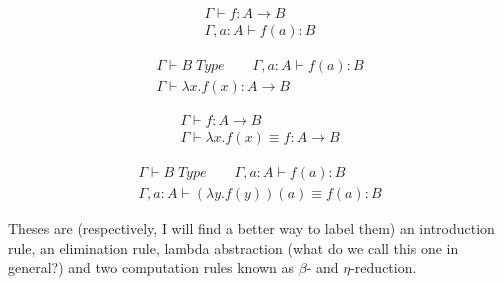 \begin{equation}
  \begin{array}{c}
    \Gamma \vdash f : A \rightarrow B\\
    \hline
    \Gamma, a : A \vdash f(a) : B
  \end{array}
  \label{rule:function-eval}
\end{equation}

\begin{equation}
  \begin{array}{c}
    \Gamma \vdash B \; Type \qquad \Gamma, a : A \vdash f(a) : B\\
    \hline
    \Gamma \vdash \lambda x . f(x) : A \rightarrow B
  \end{array}
  \label{rule:function-abstr}
\end{equation}

\begin{equation}
  \begin{array}{c}
    \Gamma \vdash f : A \rightarrow B\\
    \hline
    \Gamma \vdash \lambda x. f(x) \equiv f : A \rightarrow B
  \end{array}
  \label{rule:function-eta}
\end{equation}

\begin{equation}
  \begin{array}{c}
    \Gamma \vdash B \; Type \qquad \Gamma, a : A \vdash f(a) : B\\
    \hline
    \Gamma, a : A \vdash (\lambda y . f(y))(a) \equiv f(a) : B
  \end{array}
  \label{rule:function-beta}
\end{equation}

Theses are (respectively, I will find a better way to label them) an
introduction rule, an elimination rule, lambda abstraction (what do we call this
one in general?) and two computation rules known as $\beta$- and $\eta$-reduction.